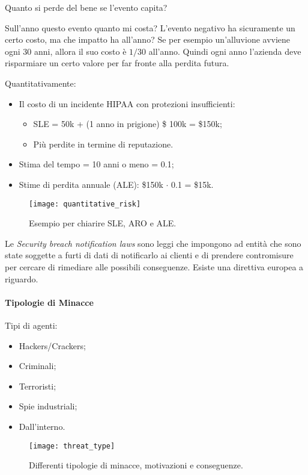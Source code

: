 Quanto si perde del bene se l'evento capita?

Sull'anno questo evento quanto mi costa? L'evento negativo ha sicuramente un
certo costo, ma che impatto ha all'anno? Se per esempio un'alluvione avviene
ogni 30 anni, allora il suo costo è $1/30$ all'anno. Quindi ogni anno l'azienda
deve risparmiare un certo valore per far fronte alla perdita futura.


Quantitativamente:
\begin{itemize}
\item Il costo di un incidente HIPAA con protezioni insufficienti:
\begin{itemize}
 \item SLE = 50k + (1 anno in prigione) \$ 100k = \$150k;
 \item Più perdite in termine di reputazione.
\end{itemize}
\item Stima del tempo = 10 anni o meno = 0.1;
\item Stime di perdita annuale (ALE): \$150k $\cdot$ 0.1 = \$15k.
\end{itemize}


\begin{figure}[H]
 \centering
 \texttt{[image: quantitative\_risk]}
 \caption{Esempio per chiarire SLE, ARO e ALE.}
\end{figure}

Le \textit{Security breach notification laws} sono leggi che impongono ad 
entità che sono state soggette a furti di dati di notificarlo ai clienti e di 
prendere contromisure per cercare di rimediare alle possibili conseguenze. 
Esiste una direttiva europea a riguardo.


\paragraph*{Tipologie di Minacce}

Tipi di agenti:
\begin{itemize}
\item Hackers/Crackers;
\item Criminali;
\item Terroristi;
\item Spie industriali;
\item Dall'interno.
\end{itemize}

\begin{figure}[H]
 \centering
 \texttt{[image: threat\_type]}
 \caption{Differenti tipologie di minacce, motivazioni e conseguenze.}
\end{figure}


